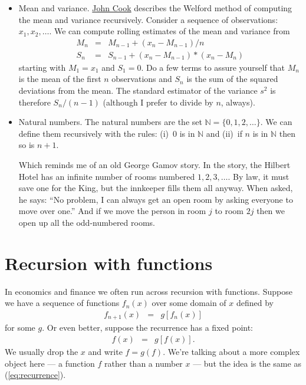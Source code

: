 \documentclass[11pt]{article}
\begin{document}
\begin{itemize}
\item Mean and variance.
\href{http://www.johndcook.com/standard_deviation.html}{John Cook}
describes the Welford method of computing the mean and variance recursively.
Consider a sequence of observations:  $ x_1, x_2, \ldots $.
We can compute rolling estimates of the mean and variance from 
\begin{eqnarray*}
    M_n &=& M_{n-1} + (x_n - M_{n-1}) / n \\
    S_n &=& S_{n-1} + (x_n - M_{n-1})*(x_n - M_n)
\end{eqnarray*}
starting with $ M_1= x_1$ and $S_1 = 0$.
Do a few terms to assure yourself that $M_n$ is the mean of the first $n$ observations
and $S_n$ is the sum of the squared deviations from the mean.
The standard estimator of the variance $s^2$ is therefore $ S_n/(n-1)$
(although I prefer to divide by $n$, always).

\item Natural numbers.
The natural numbers are the set $ \mathbb{N} = \{0,1,2,\ldots \} $.
We can  define them recursively with the rules: (i)~0 is in $\mathbb{N}$
and (ii)~if $n$ is in $\mathbb{N}$ then so is $n+1$.

Which reminds me of an old George Gamov story.
In the story, the Hilbert Hotel has an infinite number of rooms numbered $1, 2, 3, \ldots $.
By law, it must save one for the King, but the innkeeper fills them all anyway.
When asked, he says:  ``No problem, I can always get an open room by
asking everyone to move over one.''
And if we move the person in room $j$ to room $2j$ then we open up all the odd-numbered rooms.  
\end{itemize}


\section{Recursion with functions}

In economics and finance we often run across recursion with functions.
Suppose we have a sequence of functions $f_n(x)$ over some
domain of $x$ defined by
\begin{eqnarray*}
    f_{n+1}(x) &=& g[f_n(x)]
\end{eqnarray*}
for some $g$.
Or even better, suppose the recurrence has a fixed point:
\begin{eqnarray*}
    f(x) &=& g[f(x)] .
\end{eqnarray*}
We usually drop the $x$ and write $f = g(f) $.
We're talking about a more complex object here --- a function $f$ rather than a number $x$ ---
but the idea is the same as (\ref{eq:recurrence}).
\end{document}
